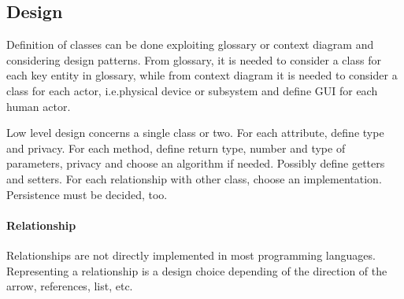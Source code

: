 \subsection{Design}
Definition of classes can be done exploiting glossary or context diagram and considering design patterns.
From glossary, it is needed to consider a class for each key entity in glossary, while from context diagram it is needed to consider a class for each actor, i.e.\@ physical device or subsystem and define GUI for each human actor.

Low level design concerns a single class or two. For each attribute, define type and privacy. For each method, define return type, number and type of parameters, privacy and choose an algorithm if needed. Possibly define getters and setters. For each relationship with other class, choose an implementation. Persistence must be decided, too.

\paragraph{Relationship}
Relationships are not directly implemented in most programming languages. Representing a relationship is a design choice depending of the direction of the arrow, references, list, etc.

